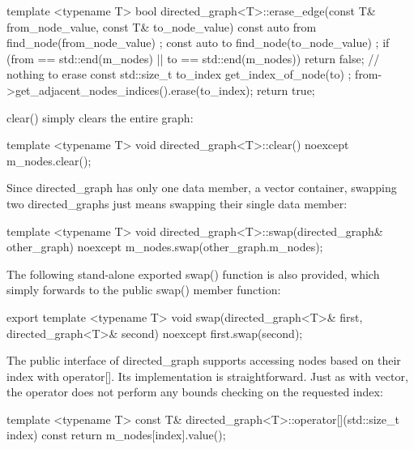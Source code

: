 \begin{cpp}
template <typename T>
bool directed_graph<T>::erase_edge(const T& from_node_value,
const T& to_node_value)
{
    const auto from { find_node(from_node_value) };
    const auto to { find_node(to_node_value) };
    if (from == std::end(m_nodes) || to == std::end(m_nodes)) {
        return false; // nothing to erase
    }
    const std::size_t to_index { get_index_of_node(to) };
    from->get_adjacent_nodes_indices().erase(to_index);
    return true;
}
\end{cpp}


clear() simply clears the entire graph:

\begin{cpp}
template <typename T>
void directed_graph<T>::clear() noexcept
{
    m_nodes.clear();
}
\end{cpp}


Since directed\_graph has only one data member, a vector container, swapping two directed\_graphs just means swapping their single data member:

\begin{cpp}
template <typename T>
void directed_graph<T>::swap(directed_graph& other_graph) noexcept
{
    m_nodes.swap(other_graph.m_nodes);
}
\end{cpp}

The following stand-alone exported swap() function is also provided, which simply forwards to the public swap() member function:

\begin{cpp}
export template <typename T>
void swap(directed_graph<T>& first, directed_graph<T>& second) noexcept
{
    first.swap(second);
}
\end{cpp}


The public interface of directed\_graph supports accessing nodes based on their index with operator[]. Its implementation is straightforward. Just as with vector, the operator does not perform any bounds checking on the requested index:

\begin{cpp}
template <typename T>
const T& directed_graph<T>::operator[](std::size_t index) const
{
    return m_nodes[index].value();
}
\end{cpp}



